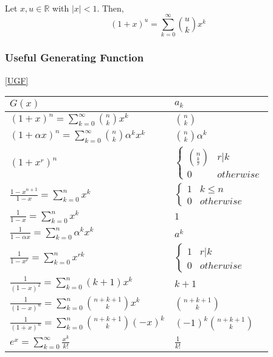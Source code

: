 \begin{theorem} \quad \\
    Let $x,u \in \mathbb{R}$ with $|x|<1$. Then,
    \[ (1+x)^u=\sum_{k=0}^{\infty} \binom{u}{k}x^k \]
\end{theorem}

\subsubsection{Useful Generating Function}

\ref{UGF}

\begin{table*}[htb]
    \centering
    \caption{Useful Generating Function}
    \label{UGF}
    \begin{tabular}[c]{|l|l|}\hline
        $G(x)$ & $a_k$ \\ \hline
        $\displaystyle (1+x)^n=\sum_{k=0}^{\infty}\binom{n}{k}x^k$ & $\displaystyle \binom{n}{k}$ \\
        $\displaystyle (1+\alpha x)^n=\sum_{k=0}^{\infty}\binom{n}{k}\alpha^k x^k$ & $\displaystyle \binom{n}{k}\alpha^k$ \\
        $\displaystyle (1+x^r)^n$ & $\displaystyle \left\{  \begin{array}{lc}
            \displaystyle \binom{n}{\frac{k}{r}} & r|k\\ 0 & otherwise
        \end{array}\right.$\\
        $\displaystyle \frac{1-x^{n+1}}{1-x}=\sum_{k=0}^n x^k$ & $\displaystyle \left\{ \begin{array}{lc}
            1 & k\le n \\ 0 & otherwise
        \end{array} \right.$ \\
        $\displaystyle \frac{1}{1-x}=\sum_{k=0}^n x^k$ & $\displaystyle 1$ \\
        $\displaystyle \frac{1}{1-\alpha x}=\sum_{k=0}^n\alpha^k x^k$ & $\displaystyle a^k$ \\
        $\displaystyle \frac{1}{1-x^r}=\sum_{k=0}^n x^{rk}$ & $\displaystyle \left\{\begin{array}{lc}
            1 & r|k \\ 0 & otherwise
        \end{array} \right.$ \\
        $\displaystyle \frac{1}{(1-x)^2}=\sum_{k=0}^n (k+1) x^k$ & $\displaystyle k+1$ \\
        $\displaystyle \frac{1}{(1-x)^n}=\sum_{k=0}^n \binom{n+k+1}{k} x^k$ & $\displaystyle \binom{n+k+1}{k}$ \\
        $\displaystyle \frac{1}{(1+x)^n}=\sum_{k=0}^n \binom{n+k+1}{k} (-x)^k$ & $\displaystyle (-1)^k\binom{n+k+1}{k}$ \\
        $\displaystyle e^x=\sum_{k=0}^{\infty}\frac{x^k}{k!}$ & $\displaystyle \frac{1}{k!}$ \\\hline
    \end{tabular}
\end{table*}

